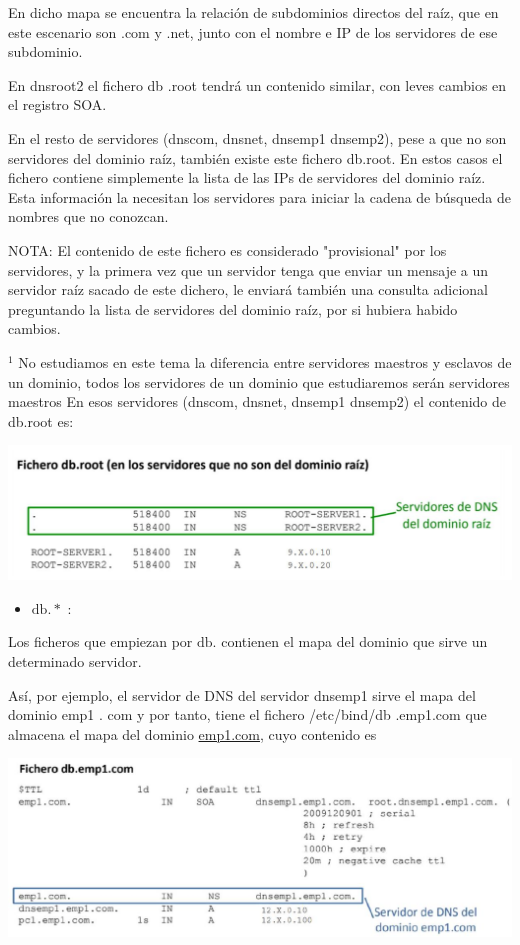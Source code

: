 \documentclass[12pt, a4paper]{report}
\begin{document}
En dicho mapa se encuentra la relación de subdominios directos del raíz, que en este escenario son .com y .net, junto con el nombre e IP de los servidores de ese subdominio.

En dnsroot2 el fichero db .root tendrá un contenido similar, con leves cambios en el registro SOA.

En el resto de servidores (dnscom, dnsnet, dnsemp1 dnsemp2), pese a que no son servidores del dominio raíz, también existe este fichero db.root. En estos casos el fichero contiene simplemente la lista de las IPs de servidores del dominio raíz. Esta información la necesitan los servidores para iniciar la cadena de búsqueda de nombres que no conozcan.

NOTA: El contenido de este fichero es considerado "provisional" por los servidores, y la primera vez que un servidor tenga que enviar un mensaje a un servidor raíz sacado de este dichero, le enviará también una consulta adicional preguntando la lista de servidores del dominio raíz, por si hubiera habido cambios.

${ }^{1}$ No estudiamos en este tema la diferencia entre servidores maestros y esclavos de un dominio, todos los servidores de un dominio que estudiaremos serán servidores maestros En esos servidores (dnscom, dnsnet, dnsemp1 dnsemp2) el contenido de db.root es:

\includegraphics[width=\textwidth]{enunciado2}

\begin{itemize}
  \item $\mathrm{db} . *$ :
\end{itemize}

Los ficheros que empiezan por $\mathrm{db}$. contienen el mapa del dominio que sirve un determinado servidor.

Así, por ejemplo, el servidor de DNS del servidor dnsemp1 sirve el mapa del dominio emp1 . com y por tanto, tiene el fichero /etc/bind/db .emp1.com que almacena el mapa del dominio \href{http://emp1.com}{emp1.com}, cuyo contenido es

\begin{center}
\includegraphics[max width=\textwidth]{2022_12_15_5d692d3f6b88770a0becg-4}
\end{center}
\end{document}
